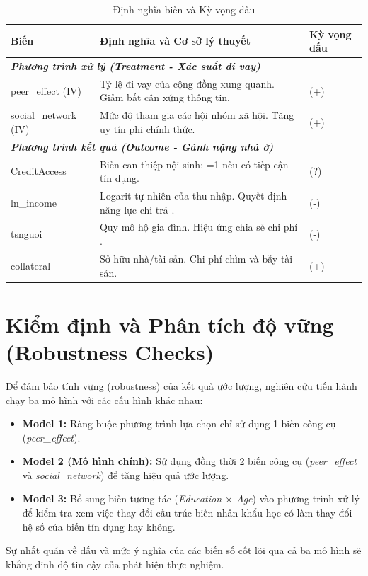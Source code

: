 \documentclass[12pt,a4paper]{report}
\begin{document}
\begin{table}[H]
	\centering
	\small
	\caption{Định nghĩa biến và Kỳ vọng dấu}
	\begin{tabular}{|p{3cm}|p{8.5cm}|p{2.5cm}|}
		\hline
		\textbf{Biến} & \textbf{Định nghĩa và Cơ sở lý thuyết} & \textbf{Kỳ vọng dấu} \\
		\hline
		\multicolumn{3}{|l|}{\textit{\textbf{Phương trình xử lý (Treatment - Xác suất đi vay)}}} \\
		\hline
		peer\_effect (IV) & Tỷ lệ đi vay của cộng đồng xung quanh. Giảm bất cân xứng thông tin. & (+) \\
		\hline
		social\_network (IV)& Mức độ tham gia các hội nhóm xã hội. Tăng uy tín phi chính thức. & (+) \\
		\hline
		\multicolumn{3}{|l|}{\textit{\textbf{Phương trình kết quả (Outcome - Gánh nặng nhà ở)}}} \\
		\hline
		CreditAccess & Biến can thiệp nội sinh: =1 nếu có tiếp cận tín dụng. & (?) \\
		\hline
		ln\_income & Logarit tự nhiên của thu nhập. Quyết định năng lực chi trả \parencite{Friedman1957}. & (-) \\
		\hline
		tsnguoi & Quy mô hộ gia đình. Hiệu ứng chia sẻ chi phí \parencite{Lipton1980}. & (-) \\
		\hline
		collateral & Sở hữu nhà/tài sản. Chi phí chìm và bẫy tài sản. & (+) \\
		\hline
	\end{tabular}
\end{table}

\section{Kiểm định và Phân tích độ vững (Robustness Checks)}

Để đảm bảo tính vững (robustness) của kết quả ước lượng, nghiên cứu tiến hành chạy ba mô hình với các cấu hình khác nhau:
\begin{itemize}
	\item \textbf{Model 1:} Ràng buộc phương trình lựa chọn chỉ sử dụng 1 biến công cụ (\textit{peer\_effect}).
	\item \textbf{Model 2 (Mô hình chính):} Sử dụng đồng thời 2 biến công cụ (\textit{peer\_effect} và \textit{social\_network}) để tăng hiệu quả ước lượng.
	\item \textbf{Model 3:} Bổ sung biến tương tác (\textit{Education $\times$ Age}) vào phương trình xử lý để kiểm tra xem việc thay đổi cấu trúc biến nhân khẩu học có làm thay đổi hệ số của biến tín dụng hay không.
\end{itemize}
Sự nhất quán về dấu và mức ý nghĩa của các biến số cốt lõi qua cả ba mô hình sẽ khẳng định độ tin cậy của phát hiện thực nghiệm.
\end{document}
